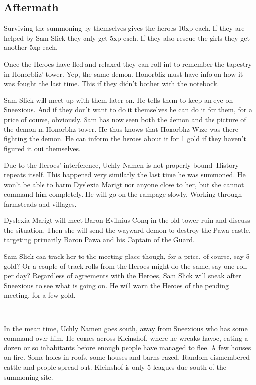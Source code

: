 \subsection*{Aftermath}
Surviving the summoning by themselves gives the heroes 10xp each. If they are helped by Sam Slick they only get 5xp each. If they also rescue the girls they get another 5xp each.

Once the Heroes have fled and relaxed they can roll int to remember the tapestry in Honorbliz' tower. Yep, the same demon. Honorbliz must have info on how it was fought the last time. This if they didn't bother with the notebook.

Sam Slick will meet up with them later on. He tells them to keep an eye on Sneexious. And if they don't want to do it themselves he can do it for them, for a price of course, obviously.
Sam has now seen both the demon and the picture of the demon in Honorbliz tower. He thus knows that Honorbliz Wize was there fighting the demon. He can inform the heroes about it for 1 gold if they haven't figured it out themselves.

Due to the Heroes' interference, Uchly Namen is not properly bound. History repeats itself. This happened very similarly the last time he was summoned.
He won't be able to harm Dyslexia Marigt nor anyone close to her, but she cannot command him completely.
He will go on the rampage slowly. Working through farmsteads and villages.

Dyslexia Marigt will meet Baron Evilnius Conq in the old tower ruin and discuss the situation. Then she will send the wayward demon to destroy the Pawa castle, targeting primarily Baron Pawa and his Captain of the Guard.

Sam Slick can track her to the meeting place though, for a price, of course, say 5 gold? Or a couple of track rolls from the Heroes might do the same, say one roll per day?
Regardless of agreements with the Heroes, Sam Slick will sneak after Sneexious to see what is going on. He will warn the Heroes of the pending meeting, for a few gold.

\

In the mean time, Uchly Namen goes south, away from Sneexious who has some command over him. He comes across Kleinshof, where he wreaks havoc, eating a dozen or so inhabitants before enough people have managed to flee.
A few houses on fire. Some holes in roofs, some houses and barns razed. Random dismembered cattle and people spread out. Kleinshof is only 5 leagues due south of the summoning site.


